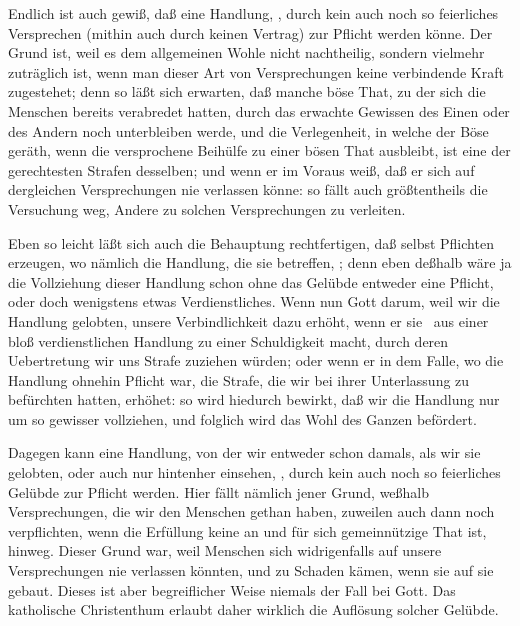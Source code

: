 \begin{aufza}
\begin{aufzb}
\item Endlich ist auch gewiß, daß eine Handlung, , durch kein auch noch so feierliches Versprechen (mithin auch durch keinen Vertrag) zur Pflicht werden könne. Der Grund ist, weil es dem allgemeinen Wohle nicht nachtheilig, sondern vielmehr zuträglich ist, wenn man dieser Art von Versprechungen keine verbindende Kraft zugestehet; denn so läßt sich erwarten, daß manche böse That, zu der sich die Menschen bereits verabredet hatten, durch das erwachte Gewissen des Einen oder des Andern noch unterbleiben werde, und die Verlegenheit, in welche der Böse geräth, wenn die versprochene Beihülfe zu einer bösen That ausbleibt, ist eine der gerechtesten Strafen desselben; und wenn er im Voraus weiß, daß er sich auf dergleichen Versprechungen nie verlassen könne: so fällt auch größtentheils die Versuchung weg, Andere zu solchen Versprechungen zu verleiten.~
\end{aufzb}
\item Eben so leicht läßt sich auch die Behauptung rechtfertigen, daß selbst  Pflichten erzeugen, wo nämlich die Handlung, die sie betreffen, ; denn eben deßhalb wäre ja die Vollziehung dieser Handlung schon ohne das Gelübde entweder eine Pflicht, oder doch wenigstens etwas Verdienstliches. Wenn nun Gott darum, weil wir die Handlung gelobten, unsere Verbindlichkeit dazu erhöht, wenn er sie \zB\  aus einer bloß verdienstlichen Handlung zu einer Schuldigkeit macht, durch deren Uebertretung wir uns Strafe zuziehen würden; oder wenn er in dem Falle, wo die Handlung ohnehin Pflicht war, die Strafe, die wir bei ihrer Unterlassung zu befürchten hatten, erhöhet: so wird hiedurch bewirkt, daß wir die Handlung nur um so gewisser vollziehen, und folglich wird das Wohl des Ganzen befördert.
\item Dagegen kann eine Handlung, von der wir entweder schon damals, als wir sie gelobten, oder auch nur hintenher einsehen, , durch kein auch noch so feierliches Gelübde zur Pflicht werden. Hier fällt nämlich jener Grund, weßhalb Versprechungen, die wir den Menschen gethan haben, zuweilen auch dann noch verpflichten, wenn die Erfüllung keine an und für sich gemeinnützige That ist, hinweg. Dieser Grund war, weil Menschen sich widrigenfalls auf unsere Versprechungen nie verlassen könnten, und zu Schaden kämen, wenn sie auf sie gebaut. Dieses ist aber begreiflicher Weise niemals der Fall bei Gott. Das katholische Christenthum erlaubt daher wirklich die Auflösung solcher Gelübde.

\end{aufza}
